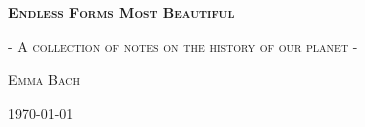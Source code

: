 \begin{titlepage}
	\centering
	{\Huge \scshape \bfseries Endless Forms Most Beautiful \par}
    \vspace{0.5cm}
    {\Large \scshape- A collection of notes on the history of our planet -\par}
    \vfill
	{\Large \scshape Emma Bach\par}
	\vfill
	{\scshape \today\par}
\end{titlepage}
